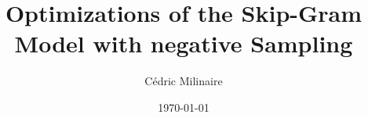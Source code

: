 \documentclass[
    numbers=noenddot,
    parskip=half-,
    fontsize=12pt,
    paper=a4,
    oneside,
    titlepage,
    bibliography=totoc,
    chapterprefix=false,
]{scrbook}
\title{Optimizations of the Skip-Gram Model with negative Sampling}
\author{Cédric Milinaire}
\date{\today}
\begin{document}
\frontmatter

%

\tableofcontents
\newpage



\newpage

%
\newpage
\thispagestyle{empty}
\cleardoublepage
\listoffigures
\newpage

\thispagestyle{empty}
\cleardoublepage
\listoftables
\newpage
\mainmatter




%





\begin{appendices}
   
 \end{appendices}
\newpage


\backmatter

\printbibliography

%
\end{document}
